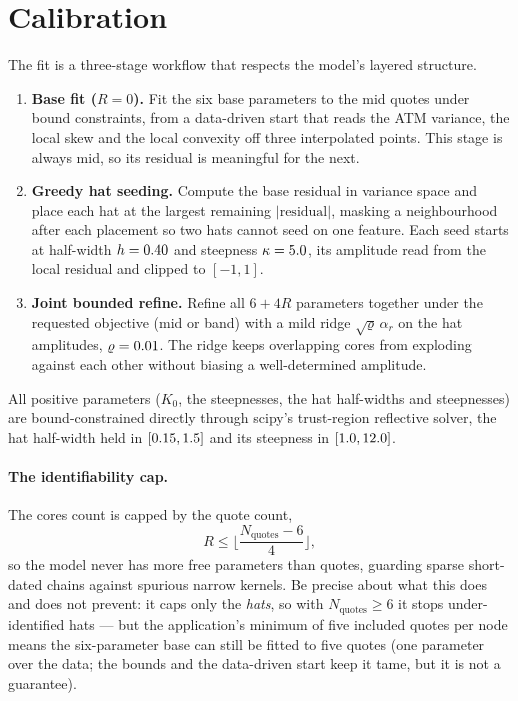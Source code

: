 \documentclass[11pt]{article}
\begin{document}
\section{Calibration}
\label{sec:calib}

The fit is a three-stage workflow that respects the model's layered structure.
\begin{enumerate}[leftmargin=1.6em]
\item \textbf{Base fit ($R=0$).}  Fit the six base parameters to the mid quotes
under bound constraints, from a data-driven start that reads the ATM variance,
the local skew and the local convexity off three interpolated points.  This
stage is always mid, so its residual is meaningful for the next.
\item \textbf{Greedy hat seeding.}  Compute the base residual in variance space
and place each hat at the largest remaining $|\text{residual}|$, masking a
neighbourhood after each placement so two hats cannot seed on one feature.  Each
seed starts at half-width $h=0.40$ and steepness $\kappa=5.0$,
its amplitude read from the local residual and clipped to $[-1,1]$.
\item \textbf{Joint bounded refine.}  Refine all $6+4R$ parameters together
under the requested objective (mid or band) with a mild ridge
$\sqrt{\varrho}\,\alpha_r$ on the hat amplitudes, $\varrho=0.01$.  The
ridge keeps overlapping cores from exploding against each other without biasing
a well-determined amplitude.
\end{enumerate}
All positive parameters ($K_0$, the steepnesses, the hat half-widths and
steepnesses) are bound-constrained directly through scipy's trust-region
reflective solver, the hat half-width held in $[0.15,1.5]$ and
its steepness in $[1.0,12.0]$.

\paragraph{The identifiability cap.}
The cores count is capped by the quote count,
\begin{equation}
R\le\Big\lfloor\frac{N_{\mathrm{quotes}}-6}{4}\Big\rfloor,
\label{eq:identifiability}
\end{equation}
so the model never has more free parameters than quotes, guarding sparse
short-dated chains against spurious narrow kernels.  Be precise about what this
does and does not prevent: it caps only the \emph{hats}, so with
$N_{\mathrm{quotes}}\ge6$ it stops under-identified hats --- but the
application's minimum of five included quotes per node means the six-parameter
base can still be fitted to five quotes (one parameter over the data; the bounds
and the data-driven start keep it tame, but it is not a guarantee).
\end{document}
